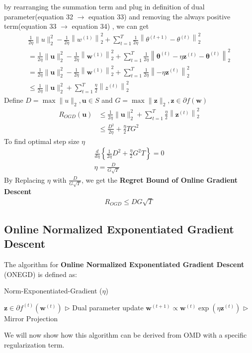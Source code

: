 \documentclass[11pt]{article}
\newcommand{\bz}{\boldsymbol{z}}
\newcommand{\bw}{\boldsymbol{w}}
\begin{document}
by rearranging the summation term and plug in definition of dual parameter(equation 32 $\rightarrow$ equation 33) and removing the always positive term(equation 33 $\rightarrow$ equation 34) , we can get 
\begin{align}
    \frac{1}{2 \eta}\|u\|_{2}^{2}-\frac{1}{2 \eta}\left\|w^{(1)}\right\|_{2}^{2}+\sum_{t=1}^{T} \frac{1}{2 \eta}\left\|\theta^{(t+1)} - \theta^{(t)}\right\|_{2}^{2} \\ 
 = \frac{1}{2 \eta}\|\boldsymbol{u}\|_{2}^{2}-\frac{1}{2 \eta}\left\|\boldsymbol{w}^{(1)}\right\|_{2}^{2}+\sum_{t=1}^{T} \frac{1}{2 \eta}\left\|\boldsymbol{\theta}^{(t)}-\eta \boldsymbol{z}^{(t)}-\boldsymbol{\theta}^{(t)}\right\|_{2}^{2} \\ 
 =\frac{1}{2 \eta}\|\boldsymbol{u}\|_{2}^{2}-\frac{1}{2 \eta}\left\|\boldsymbol{w}^{(1)}\right\|_{2}^{2}+\sum_{t=1}^{T} \frac{1}{2 \eta}\left\|-\eta \boldsymbol{z}^{(t)}\right\|_{2}^{2} \\ 
 \leq \frac{1}{2 \eta}\|\boldsymbol{u}\|_{2}^{2}+\sum_{t=1}^{T} \frac{\eta}{2}\left\|z^{(t)}\right\|_{2}^{2}
\end{align}
Define $D=\max \|u\|_{2}, \boldsymbol{u} \in S$ and $G=\max \|\boldsymbol{z}\|_{2}, \boldsymbol{z} \in \partial f(\boldsymbol{w})$
\begin{align}
    R_{OGD}(\boldsymbol{u}) & \leq \frac{1}{2 \eta}\|\boldsymbol{u}\|_{2}^{2}+\sum_{t=1}^{T} \frac{\eta}{2}\left\|\boldsymbol{z}^{(t)}\right\|_{2}^{2} \\
& \leq \frac{D^{2}}{2 \eta}+\frac{\eta}{2} T G^{2}
\end{align}
To find optimal step size $\eta$
\begin{align}
    \frac{d}{d \eta}\left\{\frac{1}{2 \eta} D^{2}+\frac{\eta}{2} G^{2} T\right\}=0 \\
    \eta=\frac{D}{G \sqrt{T}}
\end{align}
By Replacing $\eta$ with $\frac{D}{G \sqrt{T}}$, we get the \textbf{Regret Bound of Online Gradient Descent}
\begin{align}
    R_{O G D} \leq D G \sqrt{T}
\end{align}

\subsection{Online Normalized Exponentiated Gradient Descent}
The algorithm for \textbf{Online Normalized Exponentiated Gradient Descent} (ONEGD) is defined as:
\begin{algorithm}[H]
\caption{Norm-Exponentiated-Gradient ($\eta$)}
\label{algo:onegd}
\begin{algorithmic}[1]
\STATE $\bz \in \partial f^{(t)}(\bw^{(t)})$ \hfill $\triangleright$ Dual parameter update
\STATE $\bw^{(t+1)} \propto \bw^{(t)} \exp{(\eta \bz^{(t)})}$  \hfill $\triangleright$ Mirror Projection
\ENDFOR
\end{algorithmic}
\end{algorithm}
We will now show how this algorithm can be derived from OMD with a specific regularization term.
\end{document}

